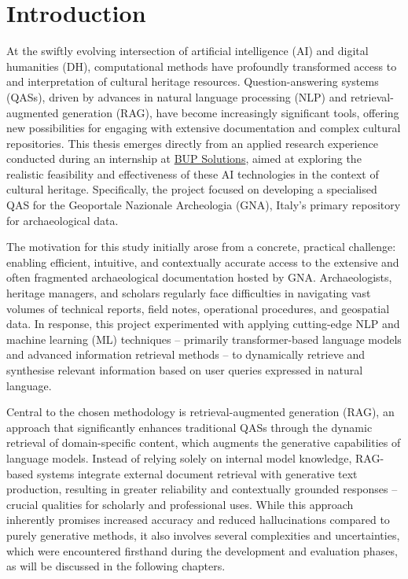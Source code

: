 \chapter{Introduction}
\label{chap:introduction}
\begin{spacing}{1.5}  %
At the swiftly evolving intersection of artificial intelligence (AI) and digital humanities (DH), computational methods have profoundly transformed access to and interpretation of cultural heritage resources. Question-answering systems (QASs), driven by advances in natural language processing (NLP) and retrieval-augmented generation (RAG), have become increasingly significant tools, offering new possibilities for engaging with extensive documentation and complex cultural repositories. This thesis emerges directly from an applied research experience conducted during an internship at \href{https://www.bupsolutions.com/en/home_en/}{BUP Solutions}\nocite{bup_solutions_bup_nodate}, aimed at exploring the realistic feasibility and effectiveness of these AI technologies in the context of cultural heritage. Specifically, the project focused on developing a specialised QAS for the Geoportale Nazionale Archeologia (GNA), Italy’s primary repository for archaeological data.

The motivation for this study initially arose from a concrete, practical challenge: enabling efficient, intuitive, and contextually accurate access to the extensive and often fragmented archaeological documentation hosted by GNA. Archaeologists, heritage managers, and scholars regularly face difficulties in navigating vast volumes of technical reports, field notes, operational procedures, and geospatial data. In response, this project experimented with applying cutting-edge NLP and machine learning (ML) techniques -- primarily transformer-based language models and advanced information retrieval methods -- to dynamically retrieve and synthesise relevant information based on user queries expressed in natural language.

Central to the chosen methodology is retrieval-augmented generation (RAG), an approach that significantly enhances traditional QASs through the dynamic retrieval of domain-specific content, which augments the generative capabilities of language models. Instead of relying solely on internal model knowledge, RAG-based systems integrate external document retrieval with generative text production, resulting in greater reliability and contextually grounded responses -- crucial qualities for scholarly and professional uses. While this approach inherently promises increased accuracy and reduced hallucinations compared to purely generative methods, it also involves several complexities and uncertainties, which were encountered firsthand during the development and evaluation phases, as will be discussed in the following chapters.


\end{spacing}
